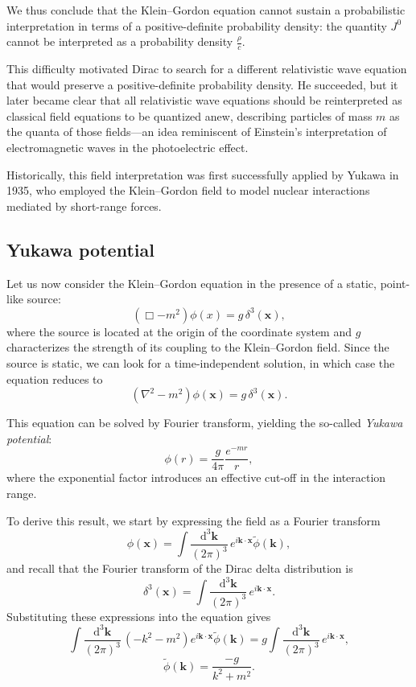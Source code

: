 We thus conclude that the Klein–Gordon equation cannot sustain a probabilistic interpretation in terms of a positive-definite probability density: the quantity $J^0$ cannot be interpreted as a probability density \(\tfrac{\rho}{c}\).

This difficulty motivated Dirac to search for a different relativistic wave equation that would preserve a positive-definite probability density. He succeeded, but it later became clear that all relativistic wave equations should be reinterpreted as classical field equations to be quantized anew, describing particles of mass $m$ as the quanta of those fields—an idea reminiscent of Einstein’s interpretation of electromagnetic waves in the photoelectric effect.

Historically, this field interpretation was first successfully applied by Yukawa in 1935, who employed the Klein–Gordon field to model nuclear interactions mediated by short-range forces.

\subsection{Yukawa potential}

Let us now consider the Klein–Gordon equation in the presence of a static, point-like source:
\[
    (\Box - m^2)\phi(x) = g\, \delta^3(\mathbf{x}),
\]
where the source is located at the origin of the coordinate system and $g$ characterizes the strength of its coupling to the Klein–Gordon field.
Since the source is static, we can look for a time-independent solution, in which case the equation reduces to
\begin{equation}
    (\nabla^2 - m^2)\phi(\mathbf{x}) = g\, \delta^3(\mathbf{x}).
    \label{eq:Klein_Gordon_static_source}
\end{equation}

This equation can be solved by Fourier transform, yielding the so-called \textit{Yukawa potential}:
\begin{equation}
    \phi(r) = \frac{g}{4\pi} \frac{e^{-m r}}{r},
\end{equation}
where the exponential factor introduces an effective cut-off in the interaction range.

To derive this result, we start by expressing the field as a Fourier transform
\[
    \phi(\mathbf{x}) = \int \frac{\mathrm{d}^3 \mathbf{k}}{(2\pi)^3}\, e^{i \mathbf{k} \cdot \mathbf{x}} \tilde{\phi}(\mathbf{k}),
\]
and recall that the Fourier transform of the Dirac delta distribution is
\[
    \delta^3(\mathbf{x}) = \int \frac{\mathrm{d}^3 \mathbf{k}}{(2\pi)^3}\, e^{i \mathbf{k} \cdot \mathbf{x}}.
\]
Substituting these expressions into the equation gives
\[
    \int \frac{\mathrm{d}^3 \mathbf{k}}{(2\pi)^3}\, (-k^2 -m^2) e^{i \mathbf{k} \cdot \mathbf{x}} \tilde{\phi}(\mathbf{k}) = g \int \frac{\mathrm{d}^3 \mathbf{k}}{(2\pi)^3}\, e^{i \mathbf{k} \cdot \mathbf{x}},
\]
\[
    \tilde{\phi}(\mathbf{k}) = \frac{-g}{k^2 + m^2}.
\]

